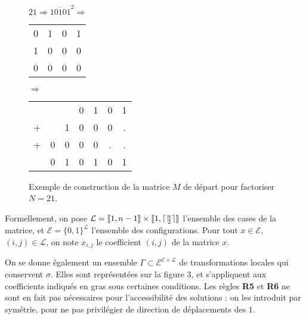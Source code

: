 \documentclass[11pt, openany]{article}
\newcommand{\cg }{[\kern-0.15em [}
\newcommand{\cd}{]\kern-0.15em]}
\newcommand{\La}{\mathcal{L}}
\newcommand{\E}{\mathcal{E}}
\begin{document}
\begin{figure}[h]
\centering

$21 \Rightarrow \overline{10101}^2 \Rightarrow$
\begin{tabular}{cccc}
0&1&0&1\\
1&0&0&0\\
0&0&0&0\\
\end{tabular}
$\Rightarrow$
\begin{tabular}{ccccccc}
&&&0&1&0&1\\
+&&1&0&0&0&.\\
+&0&0&0&0&.&.\\
\hline
&0&1&0&1&0&1\\
\end{tabular}

\caption{Exemple de construction de la matrice $M$ de départ pour factoriser $N=21$.}
\label{fig:init}
\end{figure}

Formellement, on pose $\La=\cg 1, n-1 \cd \times \cg 1, \lceil\frac{n}{2}\rceil\cd$ l'ensemble des cases de la matrice, et $\E=\{0,1\}^\La$ l'ensemble des configurations. Pour tout $x \in \E$, $(i,j)\in\La$, on note $x_{i,j}$ le coefficient $(i,j)$ de la matrice $x$. 

On se donne également un ensemble $\Gamma \subset \E^{\E\times\La}$ de transformations locales qui conservent $\sigma$. Elles sont représentées sur la figure 3, et s'appliquent aux coefficients indiqués en gras sous certaines conditions. Les règles \textbf{R5} et \textbf{R6} ne sont en fait pas nécessaires pour l'accessibilité des solutions : on les introduit par symétrie, pour ne pas privilégier de direction de déplacements des $1$. 

\end{document}
